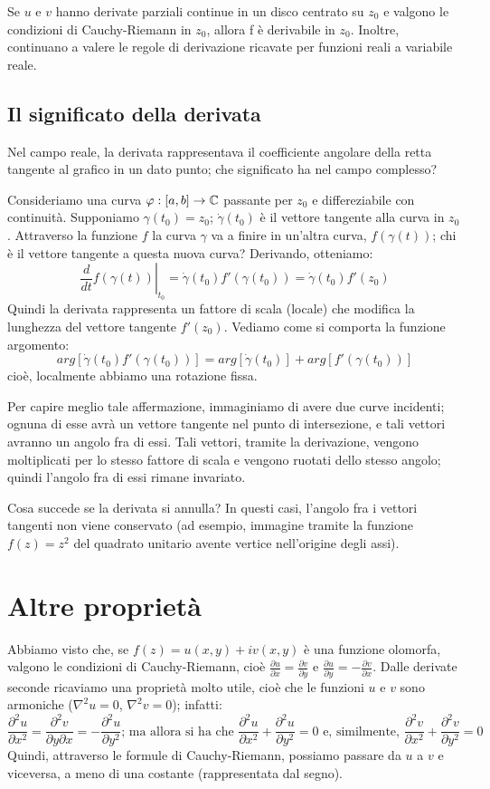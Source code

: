 Se $u$ e $v$ hanno derivate parziali continue in un disco centrato su $z_0$ e valgono le condizioni di Cauchy-Riemann in $z_0$, allora f è derivabile in $z_0$. Inoltre, continuano a valere le regole di derivazione ricavate per funzioni reali a variabile reale.

\subsection{Il significato della derivata}

Nel campo reale, la derivata rappresentava il coefficiente angolare della retta tangente al grafico in un dato punto; che significato ha nel campo complesso?

Consideriamo una curva $\varphi :[a,b] \to \mathbb{C}$ passante per $z_0$ e differeziabile con continuità. Supponiamo $\gamma(t_0)=z_0$; $\dot{\gamma}(t_0)$ è il vettore tangente alla curva in $z_0$. Attraverso la funzione $f$ la curva $\gamma$ va a finire in un'altra curva, $f(\gamma(t))$; chi è il vettore tangente a questa nuova curva? Derivando, otteniamo:
$$\left. \frac{d}{dt}f(\gamma(t))\right|_{t_0} =\dot{\gamma}(t_0) f'(\gamma(t_0)) =\dot{\gamma}(t_0) f'(z_0)$$
Quindi la derivata rappresenta un fattore di scala (locale) che modifica la lunghezza del vettore tangente $f'(z_0)$. Vediamo come si comporta la funzione argomento:
$$arg[\dot{\gamma}(t_0) f'(\gamma(t_0))]=arg[\dot{\gamma}(t_0)]+arg[ f'(\gamma(t_0))]$$ cioè, localmente abbiamo una rotazione fissa.

Per capire meglio tale affermazione, immaginiamo di avere due curve incidenti; ognuna di esse avrà un vettore tangente nel punto di intersezione, e tali vettori avranno un angolo fra di essi. Tali vettori, tramite la derivazione, vengono moltiplicati per lo stesso fattore di scala e vengono ruotati dello stesso angolo; quindi l'angolo fra di essi rimane invariato.

Cosa succede se la derivata si annulla? In questi casi, l'angolo fra i vettori tangenti non viene conservato (ad esempio, immagine tramite la funzione $f(z)=z^2$ del quadrato unitario avente vertice nell'origine degli assi).

\section{Altre proprietà}

Abbiamo visto che, se $f(z)=u(x,y)+iv(x,y)$ è una funzione olomorfa, valgono le condizioni di Cauchy-Riemann, cioè $\frac{\partial u}{\partial x}=\frac{\partial  v}{\partial y}$ e $\frac{\partial  u}{\partial y}=-\frac{\partial v}{\partial x}$. Dalle derivate seconde ricaviamo  una proprietà molto utile, cioè che le funzioni $u$ e $v$ sono  armoniche ($\nabla^2 u=0$, $\nabla^2 v=0$); infatti:
$$\frac{\partial^2 u}{\partial x^2}=\frac{\partial^2 v}{\partial y \partial x}=-\frac{\partial^2 u}{\partial y^2} \text{; ma allora si ha che } \frac{\partial^2 u}{\partial x^2}+\frac{\partial^2 u}{\partial y^2}=0 \text{ e, similmente, } \frac{\partial^2 v}{\partial x^2}+\frac{\partial^2 v}{\partial y^2}=0$$
Quindi, attraverso le formule di Cauchy-Riemann, possiamo passare da $u$ a $v$ e viceversa, a meno di una costante (rappresentata dal segno).